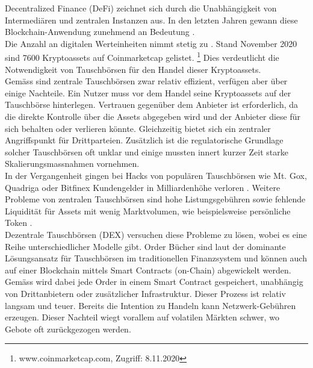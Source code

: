 \documentclass[12pt,a4paper,titlepage,oneside,english]{article}
\begin{document}
Decentralized Finance (DeFi) zeichnet sich durch die Unabhängigkeit von Intermediären und zentralen Instanzen aus. In den letzten Jahren gewann diese Blockchain-Anwendung zunehmend an Bedeutung \citep[S.1]{Schaer2020}.\\ Die Anzahl an digitalen Werteinheiten %
nimmt stetig zu \citep{Joel2020}. Stand November 2020 sind 7600 Kryptoassets auf Coinmarketcap gelistet. \footnote{www.coinmarketcap.com, Zugriff: 8.11.2020} Dies verdeutlicht die Notwendigkeit von Tauschbörsen für den Handel dieser Kryptoassets.\\
Gemäss \cite{Schaer2020} sind zentrale Tauschbörsen zwar relativ effizient, verfügen aber über einige Nachteile. Ein Nutzer muss vor dem Handel seine Kryptoassets auf der Tauschbörse hinterlegen. Vertrauen gegenüber dem Anbieter ist erforderlich, da die direkte Kontrolle über die Assets abgegeben wird und der Anbieter diese für sich behalten oder verlieren könnte. Gleichzeitig bietet sich ein zentraler Angriffspunkt für Drittparteien. Zusätzlich ist die regulatorische Grundlage solcher Tauschbörsen oft unklar und einige mussten innert kurzer Zeit starke Skalierungsmassnahmen vornehmen. \citep[vgl.][S.8]{Schaer2020} \\ In der Vergangenheit gingen bei Hacks von populären Tauschbörsen wie Mt. Gox, Quadriga oder Bitfinex Kundengelder in Milliardenhöhe verloren \citep[S.1]{Angeris2019}. 
Weitere Probleme von zentralen Tauschbörsen sind hohe Listungsgebühren sowie fehlende Liquidität für  Assets mit wenig Marktvolumen, wie beispielsweise persönliche Token \citep{Joel2020}.\\
Dezentrale Tauschbörsen (DEX) versuchen diese Probleme zu lösen, wobei es eine Reihe unterschiedlicher Modelle gibt.
Order Bücher sind laut \cite{Angeris2019} der dominante Lösungsansatz für Tauschbörsen im traditionellen Finanzsystem und können auch auf einer Blockchain mittels Smart Contracts (on-Chain) abgewickelt werden. \citep[vgl.][S.2]{Angeris2019}\\ Gemäss \citet{Schaer2020} wird dabei jede Order in einem Smart Contract gespeichert, unabhängig von Drittanbietern oder zusätzlicher Infrastruktur. Dieser Prozess  ist relativ langsam und teuer. Bereits die Intention zu Handeln kann Netzwerk-Gebühren erzeugen. Dieser Nachteil wiegt vorallem auf volatilen Märkten schwer, wo Gebote oft zurückgezogen werden. \citep[vgl.][S.9]{Schaer2020}\\
\end{document}
